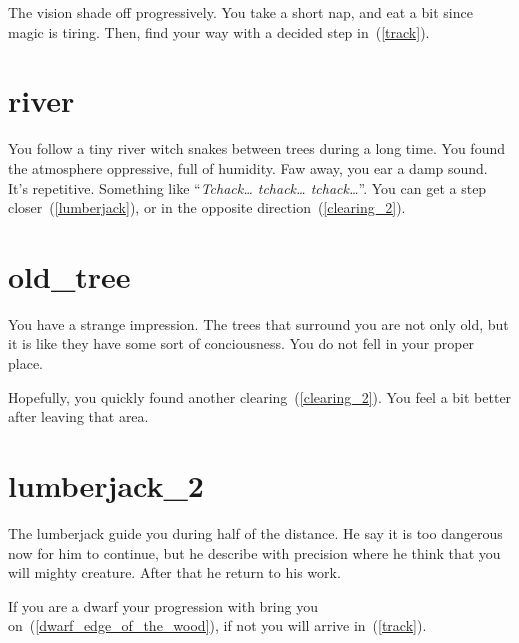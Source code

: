 The vision shade off progressively. You take a short nap, and eat a bit
since magic is tiring. Then, find your way with a decided step in~(\ref{track}).

\section{river}

You follow a tiny river witch snakes between trees during a long time. You found
the atmosphere oppressive, full of humidity. Faw away, you ear a damp sound.
It's repetitive. Something like ``\textit{Tchack… tchack… tchack…}''. You can
get a step closer~(\ref{lumberjack}), or in the opposite
direction~(\ref{clearing_2}).

\section{old_tree}

You have a strange impression. The trees that surround you are not only old, but
it is like they have some sort of conciousness. You do not fell in your proper
place.

Hopefully, you quickly found another clearing~(\ref{clearing_2}). You feel a bit
better after leaving that area.

\section{lumberjack_2}

The lumberjack guide you during half of the distance. He say it is too dangerous
now for him to continue, but he describe with precision where he think that you
will mighty creature. After that he return to his work.

If you are a dwarf your progression with bring you
on~(\ref{dwarf_edge_of_the_wood}), if not you will arrive in~(\ref{track}).
